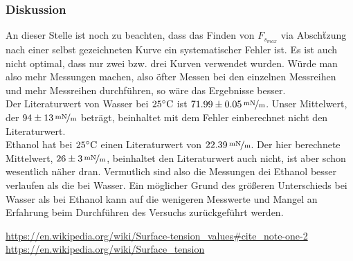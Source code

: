 \documentclass[11pt,a4paper]{article}
\begin{document}
\setcounter{section}{2}
\setcounter{subsection}{2}
\setcounter{subsubsection}{2}
\subsubsection{Diskussion}

An dieser Stelle ist noch zu beachten, dass das Finden von $F_{s_{max}}$ via Absch\"tzung nach einer selbst gezeichneten Kurve ein systematischer Fehler ist. Es ist auch nicht optimal, dass nur zwei bzw. drei Kurven verwendet wurden. W\"urde man also mehr Messungen machen, also \"ofter Messen bei den einzelnen Messreihen und mehr Messreihen durchf\"uhren, so w\"are das Ergebnisse besser.\\

Der Literaturwert von Wasser bei $25\celsius$ ist $71.99\pm 0.05\,\nicefrac{\mathrm{mN}}{\mathrm{m}}$. \cite{Wasser} Unser Mittelwert, der $94\pm 13\,\nicefrac{\mathrm{mN}}{\mathrm{m}}$ betr\"agt, beinhaltet mit dem Fehler einberechnet nicht den Literaturwert.\\

Ethanol hat bei $25\celsius$ einen Literaturwert von $22.39\,\nicefrac{\mathrm{mN}}{\mathrm{m}}$. \cite{Ethenol} Der hier berechnete Mittelwert, $26\pm 3\,\nicefrac{\mathrm{mN}}{\mathrm{m}}$, beinhaltet den Literaturwert auch nicht, ist aber schon wesentlich n\"aher dran. Vermutlich sind also die Messungen dei Ethanol besser verlaufen als die bei Wasser. Ein m\"oglicher Grund des gr\"o\ss eren Unterschieds bei Wasser als bei Ethanol kann auf die wenigeren Messwerte und Mangel an Erfahrung beim Durchf\"uhren des Versuchs zur\"uckgef\"uhrt werden.

\vfill

\begin{thebibliography}{9}
 \url{https://en.wikipedia.org/wiki/Surface-tension_values#cite_note-one-2}
 \url{https://en.wikipedia.org/wiki/Surface_tension}
\end{thebibliography}
\end{document}
